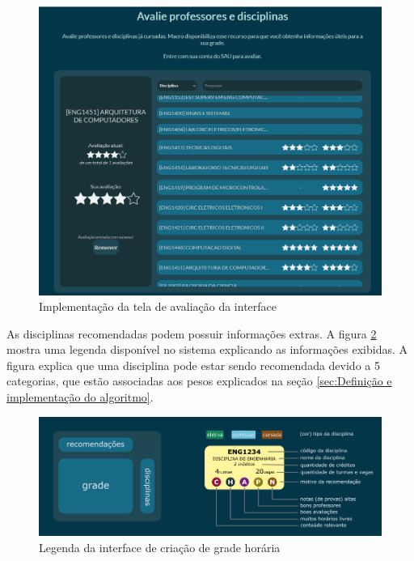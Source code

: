 \begin{figure}[ht]
    \begin{center}
    \includegraphics[width=360pt]{figuras/tela-avaliacoes.png}
    \caption{Implementação da tela de avaliação da interface}
    \label{fig:tela-avaliacao-impl}
    \end{center}
\end{figure}

As disciplinas recomendadas podem possuir informações extras. A figura \ref{fig:legenda-interface} mostra uma legenda disponível no sistema explicando as informações exibidas. A figura explica que uma disciplina pode estar sendo recomendada devido a 5 categorias, que estão associadas aos pesos explicados na seção \ref{sec:Definição e implementação do algoritmo}.

\begin{figure}[ht]
    \begin{center}
    \includegraphics[width=360pt]{figuras/legenda-interface.png}
    \caption{Legenda da interface de criação de grade horária}
    \label{fig:legenda-interface}
    \end{center}
\end{figure}